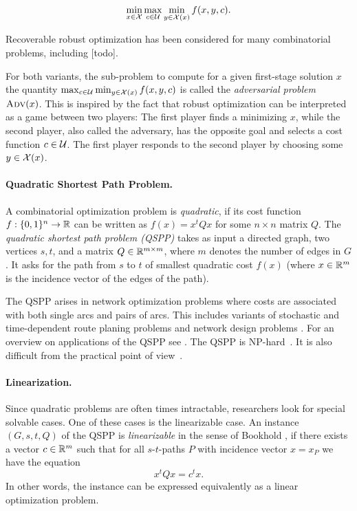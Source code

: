 \[\min_{x \in \mathcal{X}} \max_{c \in \mathcal{U}} \min_{y \in \mathcal{X}(x)} f(x,y,c).\]

Recoverable robust optimization has been considered for many combinatorial problems, including [todo]. 

For both variants, the sub-problem to compute for a given first-stage solution $x$ the quantity $\max_{c \in \mathcal{U}} \min_{y \in \mathcal{X}(x)} f(x,y,c)$ is called the \emph{adversarial problem} $\textsc{Adv}(x)$. 
This is inspired by the fact that robust optimization can be interpreted as a game between two players: The first player finds a minimizing $x$, while the second player, also called the adversary, has the opposite goal and selects a cost function $c \in \mathcal{U}$. The first player responds to the second player by choosing some $y \in \mathcal{X}(x)$.

\paragraph*{Quadratic Shortest Path Problem.}
A combinatorial optimization problem is \emph{quadratic}, if its cost function $f : \{ 0,1 \}^n \to \mathbb{R}$ can be written as $f(x) = x^tQx$ for some $n \times n$ matrix $Q$. The \emph{quadratic shortest path problem (QSPP)} takes as input a directed graph, two vertices $s,t$, and a matrix $Q \in \mathbb{R}^{m \times m}$, where $m$ denotes the number of edges in $G$. It asks for the path from $s$ to $t$ of smallest quadratic cost $f(x)$ (where $x \in \mathbb{R}^m$ is the incidence vector of the edges of the path). 

The QSPP arises 
in network optimization  problems where costs are associated with both single arcs and pairs of arcs.
This includes 
variants of stochastic and time-dependent route planing  problems  
\cite{nie2009reliable,sen2001mean,sivakumar1994variance}
and network design problems 
\cite{murakami1997restoration,gamvros2006satellite}. 
For an overview on applications of the QSPP see \cite{huSo2020,rostami2018}.
The QSPP is NP-hard~\cite{rostami2018}.
It is also difficult from the practical point of view~\cite{huSo2020}.

\paragraph*{Linearization.}
Since quadratic problems are often times intractable, researchers look for special solvable cases. One of these cases is the linearizable case. An instance $(G,s,t,Q)$ of the QSPP is \emph{linearizable} in the sense of Bookhold \cite{bookhold1990contribution}, if there exists a vector $c \in \mathbb{R}^m$ such that for all $s$-$t$-paths $P$ with incidence vector $x = x_P$ we have the equation 
\[x^tQx = c^tx. \]
In other words, the instance can be expressed equivalently as a linear optimization problem.

